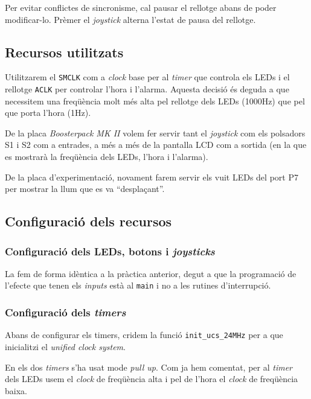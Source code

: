 \documentclass{../pdae} %
\begin{document}
Per evitar conflictes de sincronisme, cal pausar el rellotge abans
de poder modificar-lo. Prèmer el \textit{joystick} alterna l'estat de pausa
del rellotge.

\subsection{Recursos utilitzats}
Utilitzarem el \texttt{SMCLK} com a \textit{clock} base per al \textit{timer}
que controla els LEDs i el rellotge \texttt{ACLK} per controlar l'hora i
l'alarma. Aquesta decisió és deguda a que necessitem una freqüència molt més alta
pel rellotge dels LEDs (1000Hz) que pel que porta l'hora (1Hz).

De la placa \textit{Boosterpack MK II} volem fer servir tant el
\textit{joystick} com els polsadors S1 i S2 com a entrades, a més a més de la
pantalla LCD com a sortida (en la que es mostrarà la freqüència dels LEDs,
l'hora i l'alarma).

De la placa d'experimentació, novament farem servir els vuit LEDs del port P7
per mostrar la llum que es va ``desplaçant''.


\subsection{Configuració dels recursos}
\subsubsection{Configuració dels LEDs, botons i \textit{joysticks}}

La fem de forma idèntica a la pràctica anterior, degut a que la programació
de l'efecte que tenen els \textit{inputs} està al \texttt{main} i no
a les rutines d'interrupció.

\subsubsection{Configuració dels \textit{timers}}
Abans de configurar els timers, cridem la funció \texttt{init\_ucs\_24MHz} per
a que inicialitzi el \textit{unified clock system}.

En els dos \textit{timers} s'ha usat mode \textit{pull up}. Com ja hem comentat,
per al \textit{timer} dels LEDs usem el \textit{clock} de freqüència alta i
pel de l'hora el \textit{clock} de freqüència baixa.
\end{document}
